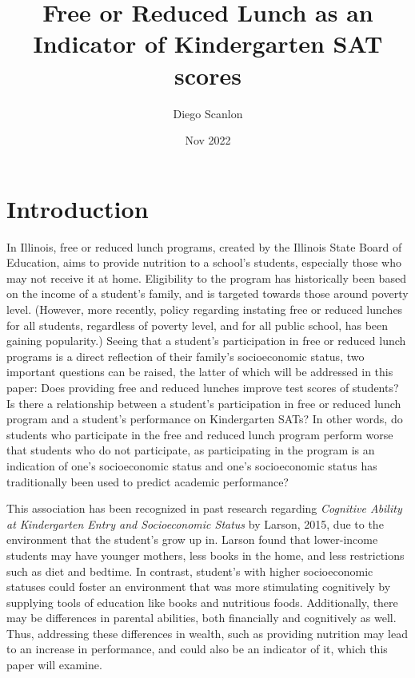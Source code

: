 \documentclass{article}
\begin{document}
\title{Free or Reduced Lunch as an Indicator of Kindergarten SAT scores} %
\author{Diego Scanlon} 
\date{Nov 2022}
\maketitle
\section{Introduction} In Illinois, free or reduced lunch programs, created by the Illinois State Board of Education, aims to provide nutrition to a school's students, especially those who may not receive it at home. Eligibility to the program has historically been based on the income of a student's family, and is targeted towards those around poverty level. (However, more recently, policy regarding instating free or reduced lunches for all students, regardless of poverty level, and for all public school, has been gaining popularity.)
Seeing that a student's participation in free or reduced lunch programs is a direct reflection of their family's socioeconomic status, two important questions can be raised, the latter of which will be addressed in this paper: Does providing free and reduced lunches improve test scores of students? Is there a relationship between a student's participation in free or reduced lunch program and a student's performance on Kindergarten SATs? In other words, do students who participate in the free and reduced lunch program perform worse that students who do not participate, as participating in the program is an indication of one's socioeconomic status and one's socioeconomic status has traditionally been used to predict academic performance?

\par This association has been recognized in past research regarding \textit{Cognitive Ability at Kindergarten Entry and Socioeconomic Status} by Larson, 2015, due to the environment that the student's grow up in. Larson found that lower-income students may have younger mothers, less books in the home, and less restrictions such as diet and bedtime. In contrast, student's with higher socioeconomic statuses could foster an environment that was more stimulating cognitively by supplying tools of education like books and nutritious foods. Additionally, there may be differences in parental abilities, both financially and cognitively as well. Thus, addressing these differences in wealth, such as providing nutrition may lead to an increase in performance, and could also be an indicator of it, which this paper will examine. 
\end{document}
